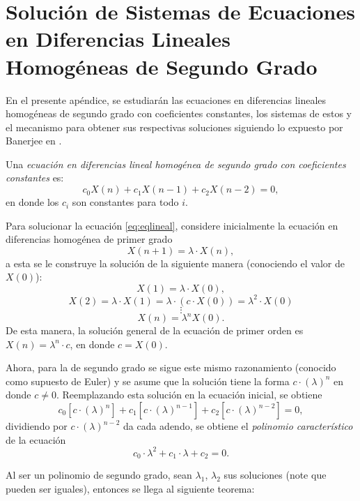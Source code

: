 \chapter{Solución de Sistemas de Ecuaciones en Diferencias Lineales Homogéneas de Segundo Grado}\label{chap:Apendice}

En el presente apéndice, se estudiarán las ecuaciones en diferencias lineales homogéneas de segundo grado con coeficientes constantes, los sistemas de estos y el mecanismo para obtener sus respectivas soluciones siguiendo lo expuesto por Banerjee en \cite{banerjee2021mathematical}.

\begin{definition}
Una \emph{ecuación en diferencias lineal homogénea de segundo grado con coeficientes constantes} es:
\begin{equation}\label{eq:eqlineal}
    c_0X(n)+c_1X(n-1)+c_2X(n-2)=0,
\end{equation}
en donde los $c_i$ son constantes para todo $i$.
\end{definition}

Para solucionar la ecuación \ref{eq:eqlineal}, considere inicialmente la ecuación en diferencias homogénea de primer grado
$$X(n+1)=\lambda\cdot X(n),$$
a esta se le construye la solución de la siguiente manera (conociendo el valor de $X(0)$):
$$X(1)=\lambda\cdot X(0),$$
$$X(2)=\lambda\cdot X(1)= \lambda\cdot (c\cdot X(0))=\lambda^2\cdot X(0)$$
$$\vdots$$
$$X(n)=\lambda^n X(0).$$ 
De esta manera, la solución general de la ecuación de primer orden es $X(n)=\lambda^n\cdot c$, en donde $c = X(0)$.

Ahora, para la de segundo grado se sigue este mismo razonamiento (conocido como supuesto de Euler) y se asume que la solución tiene la forma $c\cdot (\lambda)^n$ en donde $c \neq 0$. Reemplazando esta solución en la ecuación inicial, se obtiene
$$c_0[c\cdot (\lambda)^n]+c_1[c\cdot (\lambda)^{n-1}]+c_2[c\cdot (\lambda)^{n-2}]=0,$$
dividiendo por $c\cdot(\lambda)^{n-2}$ da cada adendo, se obtiene el \emph{polinomio característico} de la ecuación
$$c_0\cdot\lambda^2 + c_1\cdot \lambda +c_2=0.$$

Al ser un polinomio de segundo grado, sean $\lambda_1$, $\lambda_2$ sus soluciones (note que pueden ser iguales), entonces se llega al siguiente teorema:

